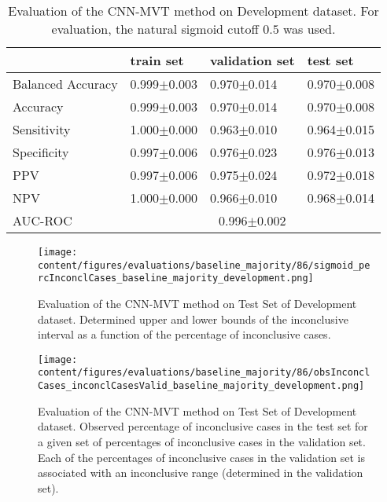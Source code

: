 \begin{table}[ht]
  \caption{Evaluation of the CNN-MVT method on Development dataset. 
  For evaluation, the natural sigmoid cutoff $0.5$ was used.}
  \centering
  \begin{tabular}{llll}
      \hline
                        & train set         & validation set      & test set             \\
      \hline
      Balanced Accuracy & 0.999$\pm$0.003   &  0.970$\pm$0.014    &  0.970$\pm$0.008   \\
      Accuracy          & 0.999$\pm$0.003    &   0.970$\pm$0.014   &  0.970$\pm$0.008   \\
      Sensitivity       &  1.000$\pm$0.000   &   0.963$\pm$0.010   &  0.964$\pm$0.015  \\
      Specificity       &   0.997$\pm$0.006   &   0.976$\pm$0.023  &   0.976$\pm$0.013  \\
      PPV               &  0.997$\pm$0.006   &   0.975$\pm$0.024   &  0.972$\pm$0.018 \\
      NPV               &  1.000$\pm$0.000    &   0.966$\pm$0.010   & 0.968$\pm$0.014  \\
      \hline
      AUC-ROC          &  \multicolumn{3}{c}{0.996$\pm$0.002}  \\
      \hline
  \end{tabular}
 \label{t1:cnn_mvt_perf_eval_table}
\end{table}


\begin{figure}[t]
  \centering
  \texttt{[image: content/figures/evaluations/baseline\_majority/86/sigmoid\_percInconclCases\_baseline\_majority\_development.png]}
  \caption{Evaluation of the CNN-MVT method on Test Set of Development dataset. 
  Determined upper and lower bounds of the inconclusive interval as a function of the percentage of inconclusive cases.} 
  \label{fig:baseline_majority_percInconclCases_development}
\end{figure}


\begin{figure}[h]
  \centering
  \texttt{[image: content/figures/evaluations/baseline\_majority/86/obsInconclCases\_inconclCasesValid\_baseline\_majority\_development.png]}
  \caption{Evaluation of the CNN-MVT method on Test Set of Development dataset.
  Observed percentage of inconclusive cases in the test set 
  for a given set of percentages of inconclusive cases in the validation set.
  Each of the percentages of inconclusive cases in the validation set is associated 
  with an inconclusive range (determined in the validation set).} 
  \label{fig:obsInconclCases_inconclCasesValid_baseline_majority_development}
\end{figure} 


